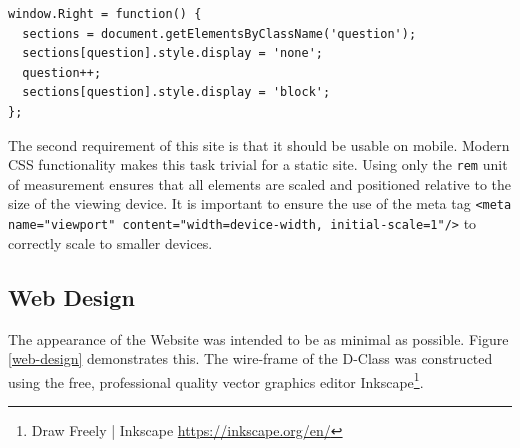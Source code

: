 \documentclass[ %
                    author={Elis Jones},
                supervisor={Dr. Kirsten Cater},
                    degree={BSc},
                     title={The Effect of Presentation Medium on Spatial Cognition},
                  subtitle={in the Virtual Environment},
                      year={2018} ]{dissertation}
\begin{document}
\begin{minipage}{\textwidth}
\centering
\begin{lstlisting}
window.Right = function() {
  sections = document.getElementsByClassName('question');
  sections[question].style.display = 'none';
  question++;
  sections[question].style.display = 'block';
};
\end{lstlisting}
\end{minipage}

The second requirement of this site is that it should be usable on mobile. Modern CSS functionality makes this task trivial for a static site. Using only the \lstinline{rem} unit of measurement ensures that all elements are scaled and positioned relative to the size of the viewing device. It is important to ensure the use of the meta tag \lstinline{<meta name="viewport" content="width=device-width, initial-scale=1"/>} to correctly scale to smaller devices. 


\subsection{Web Design}
The appearance of the Website was intended to be as minimal as possible. Figure \ref{web-design} demonstrates this. The wire-frame of the D-Class was constructed using the free, professional quality vector graphics editor Inkscape\footnote{Draw Freely | Inkscape \url{https://inkscape.org/en/}}.
\end{document}
